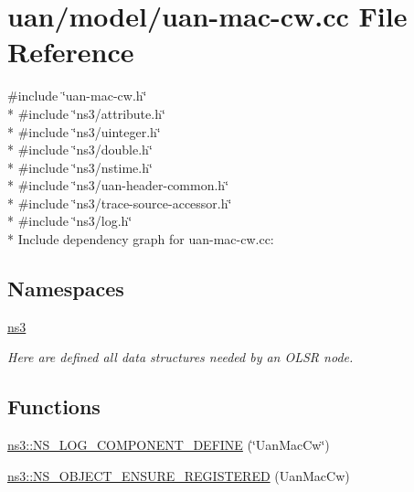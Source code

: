 \hypertarget{uan-mac-cw_8cc}{}\section{uan/model/uan-\/mac-\/cw.cc File Reference}
\label{uan-mac-cw_8cc}
{\ttfamily \#include \char`\"{}uan-\/mac-\/cw.\+h\char`\"{}}\\*
{\ttfamily \#include \char`\"{}ns3/attribute.\+h\char`\"{}}\\*
{\ttfamily \#include \char`\"{}ns3/uinteger.\+h\char`\"{}}\\*
{\ttfamily \#include \char`\"{}ns3/double.\+h\char`\"{}}\\*
{\ttfamily \#include \char`\"{}ns3/nstime.\+h\char`\"{}}\\*
{\ttfamily \#include \char`\"{}ns3/uan-\/header-\/common.\+h\char`\"{}}\\*
{\ttfamily \#include \char`\"{}ns3/trace-\/source-\/accessor.\+h\char`\"{}}\\*
{\ttfamily \#include \char`\"{}ns3/log.\+h\char`\"{}}\\*
Include dependency graph for uan-\/mac-\/cw.cc\+:
\subsection*{Namespaces}
\begin{DoxyCompactItemize}
\item 
 \hyperlink{namespacens3}{ns3}
\begin{DoxyCompactList}\small\item\em Here are defined all data structures needed by an O\+L\+SR node. \end{DoxyCompactList}\end{DoxyCompactItemize}
\subsection*{Functions}
\begin{DoxyCompactItemize}
\item 
\hyperlink{namespacens3_a6ad618bd7038531490be62b810b94cfc}{ns3\+::\+N\+S\+\_\+\+L\+O\+G\+\_\+\+C\+O\+M\+P\+O\+N\+E\+N\+T\+\_\+\+D\+E\+F\+I\+NE} (\char`\"{}Uan\+Mac\+Cw\char`\"{})
\item 
\hyperlink{namespacens3_a6590695d506b6d549b8702af27e22ff5}{ns3\+::\+N\+S\+\_\+\+O\+B\+J\+E\+C\+T\+\_\+\+E\+N\+S\+U\+R\+E\+\_\+\+R\+E\+G\+I\+S\+T\+E\+R\+ED} (Uan\+Mac\+Cw)
\end{DoxyCompactItemize}
